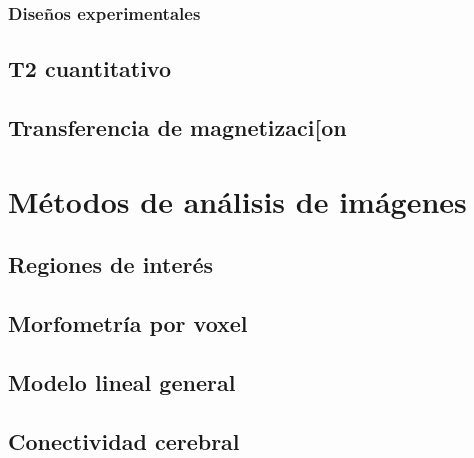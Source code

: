 \documentclass[]{memoir}          %
\begin{document}
\section{Diseños experimentales}


\chapter{T2 cuantitativo}
\label{chapter_T2}



\chapter{Transferencia de magnetizaci[on}
\label{chapter_mt}







\part{Métodos de análisis de imágenes}
\label{part_metodos}


\chapter{Regiones de interés}
\label{chapter_roi}


\chapter{Morfometría por voxel}
\label{chapter_vbm}


\chapter{Modelo lineal general}
\label{chapter_mlg}

\chapter{Conectividad cerebral}
\label{chapter_conectividad}
\end{document}
